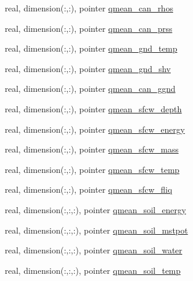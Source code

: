 \begin{DoxyCompactItemize}
real, dimension(\+:,\+:), pointer \hyperlink{structed__state__vars_1_1sitetype_a0dae1159ec8cf126350cef7d44e04a7e}{qmean\+\_\+can\+\_\+rhos}
\item 
real, dimension(\+:,\+:), pointer \hyperlink{structed__state__vars_1_1sitetype_a7dcabf39abdcb986066ffe8ede7012a5}{qmean\+\_\+can\+\_\+prss}
\item 
real, dimension(\+:,\+:), pointer \hyperlink{structed__state__vars_1_1sitetype_af84bdb4423442f58e1b807b87007f82f}{qmean\+\_\+gnd\+\_\+temp}
\item 
real, dimension(\+:,\+:), pointer \hyperlink{structed__state__vars_1_1sitetype_a725edd177886e7cc328b2670f6e3c800}{qmean\+\_\+gnd\+\_\+shv}
\item 
real, dimension(\+:,\+:), pointer \hyperlink{structed__state__vars_1_1sitetype_a8f7e503531784f698c75e6694477b6e2}{qmean\+\_\+can\+\_\+ggnd}
\item 
real, dimension(\+:,\+:), pointer \hyperlink{structed__state__vars_1_1sitetype_aad9ee0d191030be98ad05a1dbffd9a86}{qmean\+\_\+sfcw\+\_\+depth}
\item 
real, dimension(\+:,\+:), pointer \hyperlink{structed__state__vars_1_1sitetype_a2350cefa66bbb6e9c2aa92864ed04b26}{qmean\+\_\+sfcw\+\_\+energy}
\item 
real, dimension(\+:,\+:), pointer \hyperlink{structed__state__vars_1_1sitetype_a2042f744ef911f6589f0c6df8998d183}{qmean\+\_\+sfcw\+\_\+mass}
\item 
real, dimension(\+:,\+:), pointer \hyperlink{structed__state__vars_1_1sitetype_a1b8ea2f5bf54bf041ccf897d6c605124}{qmean\+\_\+sfcw\+\_\+temp}
\item 
real, dimension(\+:,\+:), pointer \hyperlink{structed__state__vars_1_1sitetype_a338710845088ec5a245b7261a5a3b5ad}{qmean\+\_\+sfcw\+\_\+fliq}
\item 
real, dimension(\+:,\+:,\+:), pointer \hyperlink{structed__state__vars_1_1sitetype_a669f604996cb8a7cc956cc1e085effa4}{qmean\+\_\+soil\+\_\+energy}
\item 
real, dimension(\+:,\+:,\+:), pointer \hyperlink{structed__state__vars_1_1sitetype_a789610197e020c310c6e35899f05e56b}{qmean\+\_\+soil\+\_\+mstpot}
\item 
real, dimension(\+:,\+:,\+:), pointer \hyperlink{structed__state__vars_1_1sitetype_a929f4c40788afc89424b09cc2c6437e8}{qmean\+\_\+soil\+\_\+water}
\item 
real, dimension(\+:,\+:,\+:), pointer \hyperlink{structed__state__vars_1_1sitetype_a374969b053d1c9a369a3632303c3171c}{qmean\+\_\+soil\+\_\+temp}

\end{DoxyCompactItemize}
